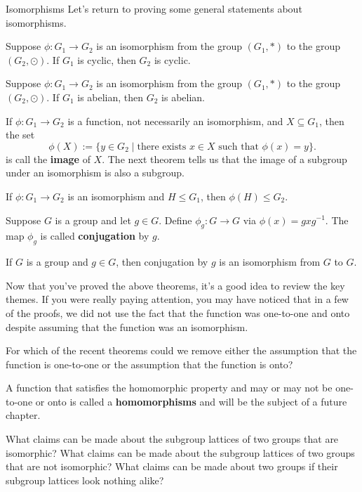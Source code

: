 \begin{section}{Isomorphisms}
Let's return to proving some general statements about isomorphisms.

\begin{theorem}
Suppose $\phi:G_1\to G_2$ is an isomorphism from the group $(G_1,*)$ to the group $(G_2,\odot)$. If $G_1$ is cyclic, then $G_2$ is cyclic.
\end{theorem}

\begin{theorem}
Suppose $\phi:G_1\to G_2$ is an isomorphism from the group $(G_1,*)$ to the group $(G_2,\odot)$. If $G_1$ is abelian, then $G_2$ is abelian.
\end{theorem}

If $\phi:G_1\to G_2$ is a function, not necessarily an isomorphism, and $X\subseteq G_1$, then the set
\[
\phi(X):=\{y\in G_2\mid \text{there exists } x\in X\text{ such that }\phi(x)=y\}. 
\]
is call the \textbf{image} of $X$.  The next theorem tells us that the image of a subgroup under an isomorphism is also a subgroup.

\begin{theorem}
If $\phi:G_1\to G_2$ is an isomorphism and $H\leq G_1$, then $\phi(H)\leq G_2$.
\end{theorem}

Suppose $G$ is a group and let $g\in G$.  Define $\phi_g:G\to G$ via $\phi(x)=gxg^{-1}$.  The map $\phi_g$ is called \textbf{conjugation} by $g$.

\begin{theorem}
If $G$ is a group and $g\in G$, then conjugation by $g$ is an isomorphism from $G$ to $G$.
\end{theorem}

Now that you've proved the above theorems, it's a good idea to review the key themes.  If you were really paying attention, you may have noticed that in a few of the proofs, we did not use the fact that the function was one-to-one and onto despite assuming that the function was an isomorphism.

\begin{problem}
For which of the recent theorems could we remove either the assumption that the function is one-to-one or the assumption that the function is onto?
\end{problem}

A function that satisfies the homomorphic property and may or may not be one-to-one or onto is called a \textbf{homomorphisms} and will be the subject of a future chapter.

\begin{problem}
What claims can be made about the subgroup lattices of two groups that are isomorphic? What claims can be made about the subgroup lattices of two groups that are not isomorphic?  What claims can be made about two groups if their subgroup lattices look nothing alike?
\end{problem}

\end{section}